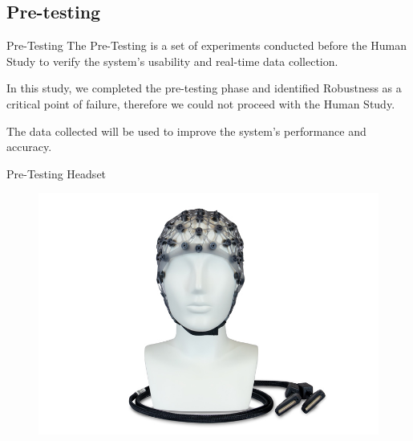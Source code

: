 \subsection*{Pre-testing}
\begin{frame}{Pre-Testing}
    The Pre-Testing is a set of experiments conducted before the Human Study to verify the system's usability and real-time data collection.

    \vspace*{.5cm}
    In this study, we completed the pre-testing phase and identified Robustness as a critical point of failure, therefore we could not proceed with the Human Study.

    \vspace*{.5cm}
    The data collected will be used to improve the system's performance and accuracy.
\end{frame}
\begin{frame}{Pre-Testing \textemdash{} Headset}
    \begin{figure}
        \includegraphics[width=\textwidth]{figures/results/EEG_CAP}
    \end{figure}
\end{frame}

